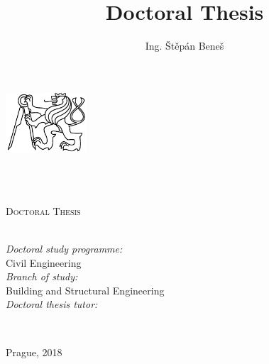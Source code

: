 \documentclass[
11pt, %
english, %
singlespacing, %
headsepline, %
]{MastersDoctoralThesis} %
\title{Doctoral Thesis}
\author{Ing. \v{S}t\v{e}p\'{a}n Bene\v{s}} %
\begin{document}
\frontmatter %

\pagestyle{plain} %


\begin{titlepage}
\begin{center}

\includegraphics[width=30mm]{figures/logo-cvut} \\
{\scshape\LARGE \univname\par} %
\HRule \\[0.2cm] %
\facname\\[0.2cm] %
\deptname %
\vspace{3.5cm}

{\huge \bfseries \ttitle\par}\vspace{1.0cm} %

\textsc{\Large Doctoral Thesis}\\[1.5cm] %
 
{\large \authorname}\\[3.0cm] %


\begin{minipage}[t]{\textwidth}
\begin{flushleft}
\emph{Doctoral study programme:} \\
Civil Engineering \\[0.5cm] %
\emph{Branch of study:} \\
Building and Structural Engineering \\[0.5cm] %

\emph{Doctoral thesis tutor:} \\
\supname %
\end{flushleft}
\end{minipage}\\[3cm]

\vfill

{\large Prague, 2018}\\[2cm] %
 
\vfill
\end{center}
\end{titlepage}
\end{document}
